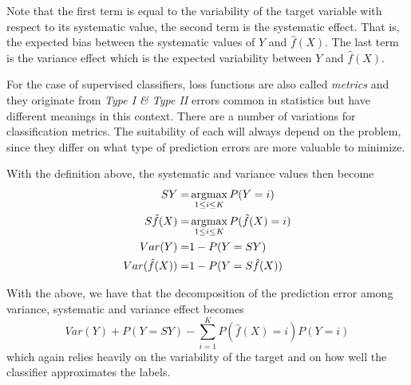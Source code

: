Note that the first term is equal to the variability of the target variable with respect to its systematic value, the second term is the systematic effect.
That is, the expected bias between the systematic values of $Y$ and $\hat{f}(X)$.
The last term is the variance effect which is the expected variability between $Y$ and $\hat{f}(X)$.


For the case of supervised classifiers, loss functions are also called \textit{metrics} and they originate from \textit{Type I \& Type II} errors common in statistics but have different meanings in this context.
There are a number of variations for classification metrics.
The suitability of each will always depend on the problem, since they differ on what type of prediction errors are more valuable to minimize.

With the definition above, the systematic and variance values then become
\begin{equation}
	\begin{split}
	SY = & \operatorname*{argmax}_{1\leq i \leq K} P(Y=i) \\
	S\hat{f}(X) = &\operatorname*{argmax}_{1\leq i \leq K} P(\hat{f}(X)=i) \\
	Var(Y) = &1 - P(Y=SY) \\
	Var(\hat{f}(X)) =& 1 - P(Y = S\hat{f}(X)) \\
	\end{split}
\end{equation}


With the above, we have that the decomposition of the prediction error among variance, systematic and variance effect becomes
\begin{equation}
Var(Y) + P(Y=SY) - \sum_{i=1}^K P(\hat{f}(X) =i)P(Y=i)
\end{equation}
	 which again relies heavily on the variability of the target and on how well the classifier approximates the labels.

